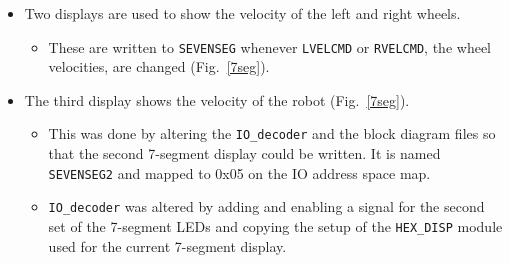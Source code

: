 \begin{itemize}
\item Two displays are used to show the velocity of the left and
  right wheels.
  \begin{itemize}
  \item These are written to \verb+SEVENSEG+ whenever \verb+LVELCMD+
    or \verb+RVELCMD+, the wheel velocities, are changed
    (Fig.~\ref{7seg}).
  \end{itemize}
\item The third display shows the velocity of the robot
  (Fig.~\ref{7seg}).
  \begin{itemize}
  \item This was done by altering the \verb+IO_decoder+ and the block
    diagram files so that the second 7-segment display
    could be written. It is named \verb+SEVENSEG2+ and mapped to
    0x05 on the IO address space map.
  \item\verb+IO_decoder+ was altered by adding and enabling a
    signal for the second set of the 7-segment LEDs and copying the
    setup of the \verb+HEX_DISP+ module used for the current 7-segment
    display.
  \end{itemize}

\begin{figure}[h!]
  \centering \cprotect {}
\end{figure}


\end{itemize}
